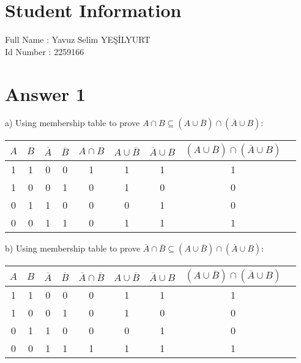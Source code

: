 \documentclass[12pt]{article}
\begin{document}
\section*{Student Information } 
Full Name : Yavuz Selim YEŞİLYURT \\
Id Number : 2259166 \\

\section*{Answer 1}
\hspace{5mm} a) Using membership table to prove $A \cap B \subseteq (A \cup \overline B) \cap (\overline A \cup B)$:
\begin{table}[H]
\small
\centering
\begin{tabular}{|c|c|c|c|c|c|c|c|c}	
\hline
$A$ & $B$ & $ \overline A $ & $ \overline B$ & $A \cap B$ & $A \cup \overline B$ & $\overline A \cup B$ & $ (A \cup \overline B) \cap (\overline A \cup B)$\\
\hline 
1 & 1 & 0 & 0 & 1 & 1 & 1 & 1\\			
1 & 0 & 0 & 1 & 0 & 1 & 0 & 0\\
0 & 1 & 1 & 0 & 0 & 0 & 1 & 0\\
0 & 0 & 1 & 1 & 0 & 1 & 1 & 1\\
\hline 
\end{tabular}
\end{table}
b) Using membership table to prove $\overline A \cap \overline B \subseteq (A \cup \overline B) \cap (\overline A \cup B)$:
\begin{table}[H]
\small
\centering
\begin{tabular}{|c|c|c|c|c|c|c|c|c}	
\hline
$A$ & $B$ & $ \overline A $ & $ \overline B$ & $\overline A \cap \overline B $ & $A \cup \overline B$ & $\overline A \cup B$ & $ (A \cup \overline B) \cap (\overline A \cup B)$\\
\hline 
1 & 1 & 0 & 0 & 0 & 1 & 1 & 1\\			
1 & 0 & 0 & 1 & 0 & 1 & 0 & 0\\
0 & 1 & 1 & 0 & 0 & 0 & 1 & 0\\
0 & 0 & 1 & 1 & 1 & 1 & 1 & 1\\
\hline 
\end{tabular}
\end{table}
\end{document}
